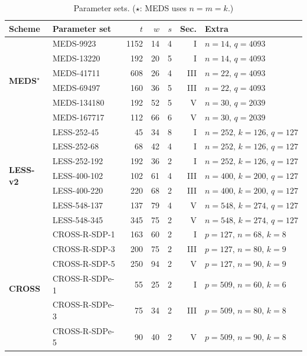 \begin{table}[htbp]
\centering
\caption{Parameter sets. ($\star$: MEDS uses $n{=}m{=}k$.)}
\label{tab:scheme-params}
\setlength{\tabcolsep}{4pt}
\small
\begin{tabular}{@{}llrrrrl@{}}
\toprule
\textbf{Scheme} & \textbf{Parameter set} & $t$ & $w$ & $s$ & \textbf{Sec.} & \textbf{Extra} \\
\midrule
\multirow{6}{*}{\textbf{MEDS}$^\star$}
  & MEDS-9923   & 1152 & 14 & 4 & I   & $n{=}14,\,q{=}4093$ \\
  & MEDS-13220  &  192 & 20 & 5 & I   & $n{=}14,\,q{=}4093$ \\
  & MEDS-41711  &  608 & 26 & 4 & III & $n{=}22,\,q{=}4093$ \\
  & MEDS-69497  &  160 & 36 & 5 & III & $n{=}22,\,q{=}4093$ \\
  & MEDS-134180 &  192 & 52 & 5 & V   & $n{=}30,\,q{=}2039$ \\
  & MEDS-167717 &  112 & 66 & 6 & V   & $n{=}30,\,q{=}2039$ \\
\midrule
\multirow{7}{*}{\textbf{LESS-v2}}
  & LESS-252-45   &  45 & 34 & 8 & I   & $n{=}252,\,k{=}126,\,q{=}127$ \\
  & LESS-252-68   &  68 & 42 & 4 & I   & $n{=}252,\,k{=}126,\,q{=}127$ \\
  & LESS-252-192  & 192 & 36 & 2 & I   & $n{=}252,\,k{=}126,\,q{=}127$ \\
  & LESS-400-102  & 102 & 61 & 4 & III & $n{=}400,\,k{=}200,\,q{=}127$ \\
  & LESS-400-220  & 220 & 68 & 2 & III & $n{=}400,\,k{=}200,\,q{=}127$ \\
  & LESS-548-137  & 137 & 79 & 4 & V   & $n{=}548,\,k{=}274,\,q{=}127$ \\
  & LESS-548-345  & 345 & 75 & 2 & V   & $n{=}548,\,k{=}274,\,q{=}127$ \\
\midrule
\multirow{6}{*}{\textbf{CROSS}}
  & CROSS-R-SDP-1   & 163 & 60 & 2 & I   & $p{=}127,\,n{=}68,\,k{=}8$ \\
  & CROSS-R-SDP-3   & 200 & 75 & 2 & III & $p{=}127,\,n{=}80,\,k{=}9$ \\
  & CROSS-R-SDP-5   & 250 & 94 & 2 & V   & $p{=}127,\,n{=}90,\,k{=}9$ \\
  & CROSS-R-SDPe-1  &  55 & 25 & 2 & I   & $p{=}509,\,n{=}60,\,k{=}6$ \\
  & CROSS-R-SDPe-3  &  75 & 34 & 2 & III & $p{=}509,\,n{=}80,\,k{=}8$ \\
  & CROSS-R-SDPe-5  &  90 & 40 & 2 & V   & $p{=}509,\,n{=}90,\,k{=}8$ \\
\bottomrule
\end{tabular}
\end{table}

